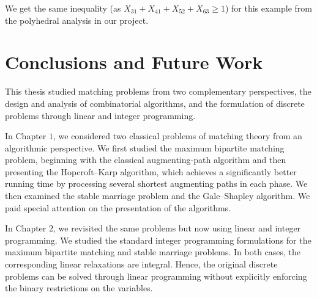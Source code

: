 \documentclass[12pt]{report}
\numberwithin{algorithm}{chapter}
\begin{document}
	We get the same inequality (as $X_{31} + X_{41} + X_{52} + X_{63} \ge 1$) for this example from the polyhedral analysis in our project.

\chapter{Conclusions and Future Work}

	This thesis studied matching problems from two complementary perspectives, the design and analysis of combinatorial algorithms, and the formulation of discrete problems through linear and integer programming.
	
	In Chapter $1$, we considered two classical problems of matching theory from an algorithmic perspective. We first studied the maximum bipartite matching
	problem, beginning with the classical augmenting-path algorithm and then
	presenting the Hopcroft–Karp algorithm, which achieves a significantly better
	running time by processing several shortest augmenting paths in each phase.
	We then examined the stable marriage problem and the Gale–Shapley algorithm.
	We paid special attention on the presentation of the algorithms.
	
	In Chapter $2$, we revisited the same problems but now using linear and integer programming. We studied the standard integer programming formulations for the maximum bipartite matching and stable marriage problems. In both cases, the corresponding linear relaxations are integral. Hence, the original discrete problems can be solved through linear programming without explicitly enforcing the binary restrictions on the variables.
	
\end{document}
